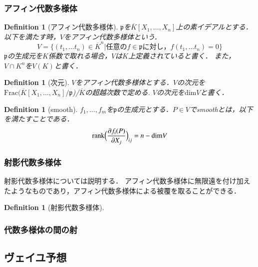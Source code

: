 \documentclass{ujarticle}
\newtheorem{dfn}[thm]{Definition}
\begin{document}
\subsubsection{アフィン代数多様体}
\label{subs:アフィン代数多様体}

\begin{dfn}[アフィン代数多様体]
$\mathfrak{p}$を$\overline{K}[X_1,\dots,X_n]$上の素イデアルとする．以下を満たす時，$V$をアフィン代数多様体という．
\begin{equation*}
  V = \{ (t_1, \dots t_n) \in {\overline{K}}^n | \mbox{任意の}f \in \mathfrak{p} \mbox{に対し，}f(t_1, \dots t_n)=0 \}
\end{equation*}
$\mathfrak{p}$の生成元を$K$係数で取れる場合，$V$は$K$上定義されていると書く．
また，$V \cap K^n$を$V(K)$と書く．
\end{dfn}
\begin{dfn}[次元]
$V$をアフィン代数多様体とする．$V$の次元を$\mathrm{Frac}(\overline{K}[X_1,\dots,X_n]/\mathfrak{p}$)/$\overline{K}$の超越次数で定める.
$V$の次元を$\mathrm{dim}V$と書く．
\end{dfn}

\begin{dfn}[smooth]
  $f_1,\dots,f_m$を$\mathfrak{p}$の生成元とする．$P \in V$でsmoothとは，以下を満たすことである．
  \begin{equation*}
    \mathrm{rank}\Bigl(\frac{ \partial f_i(P)}{ \partial X_j} \Bigr)_{ij} = n - \mathrm{dim}V
  \end{equation*}
\end{dfn}

\subsubsection{射影代数多様体}
\label{subs:射影代数多様体}

射影代数多様体については説明する．
アフィン代数多様体に無限遠を付け加えたようなものであり，アフィン代数多様体による被覆を取ることができる．
\begin{dfn}[射影代数多様体]

\end{dfn}

\subsubsection{代数多様体の間の射}
\label{subs:代数多様体の間の射}


\subsection{ヴェイユ予想}
\label{sub:ヴェイユ予想}
\end{document}
